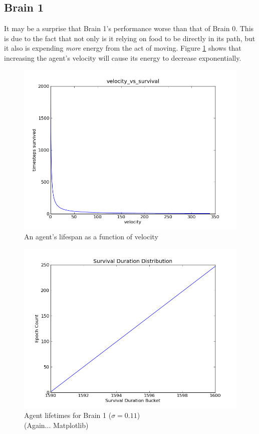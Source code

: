 \subsection{Brain 1}
It may be a surprise that Brain 1's performance worse than that of Brain 0. 
This is due to the fact that not only is
it relying on food to be directly in its path, but it also is expending 
\emph{more} energy from the act of moving. Figure \ref{fig:brain1velo} shows
that increasing the agent's velocity will cause its energy to decrease
exponentially.

\begin{figure}
\begin{center}
  \includegraphics[scale=.65]{plots/brain1velo.png}
  \caption{An agent's lifespan as a function of velocity}
  \label{fig:brain1velo}
\end{center}
\end{figure}

\begin{figure}
\begin{center}
  \includegraphics[scale=.65]{plots/brain1hist.png}
  \caption{Agent lifetimes for Brain 1 ($\sigma = 0.11$)\\
  (Again... Matplotlib)}
  \label{fig:brain1his}
\end{center}
\end{figure}

